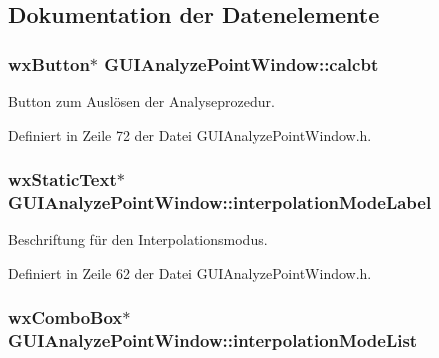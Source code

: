 \subsection{Dokumentation der Datenelemente}
\hypertarget{classGUIAnalyzePointWindow_a2650076436d57254fa9dd0df3783593e}{
\subsubsection[{calcbt}]{\setlength{\rightskip}{0pt plus 5cm}wx\-Button$\ast$ G\-U\-I\-Analyze\-Point\-Window\-::calcbt\hspace{0.3cm}{\ttfamily [private]}}}\label{classGUIAnalyzePointWindow_a2650076436d57254fa9dd0df3783593e}


Button zum Auslösen der Analyseprozedur. 



Definiert in Zeile 72 der Datei G\-U\-I\-Analyze\-Point\-Window.\-h.

\hypertarget{classGUIAnalyzePointWindow_a6a1b5c74ab4aca0f3ccea3ef83043b35}{
\subsubsection[{interpolation\-Mode\-Label}]{\setlength{\rightskip}{0pt plus 5cm}wx\-Static\-Text$\ast$ G\-U\-I\-Analyze\-Point\-Window\-::interpolation\-Mode\-Label\hspace{0.3cm}{\ttfamily [private]}}}\label{classGUIAnalyzePointWindow_a6a1b5c74ab4aca0f3ccea3ef83043b35}


Beschriftung für den Interpolationsmodus. 



Definiert in Zeile 62 der Datei G\-U\-I\-Analyze\-Point\-Window.\-h.

\hypertarget{classGUIAnalyzePointWindow_a6b2da34e788e56e70789d2cfc9767357}{
\subsubsection[{interpolation\-Mode\-List}]{\setlength{\rightskip}{0pt plus 5cm}wx\-Combo\-Box$\ast$ G\-U\-I\-Analyze\-Point\-Window\-::interpolation\-Mode\-List\hspace{0.3cm}{\ttfamily [private]}}}\label{classGUIAnalyzePointWindow_a6b2da34e788e56e70789d2cfc9767357}


